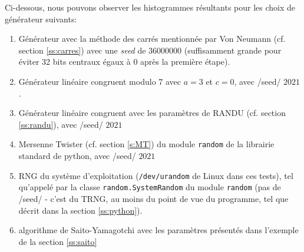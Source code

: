 \documentclass{scrartcl}
\begin{document}
Ci-dessous, nous pouvons observer les histogrammes résultants pour les choix de
générateur suivants:
\begin{enumerate}
\item Générateur avec la méthode des carrés mentionnée par Von Neumann
  (cf. section \ref{ss:carres}) avec une \textit{seed} de $36000000$
  (suffisamment grande pour éviter 32 bits centraux égaux à 0 après la première
  étape).
\item Générateur linéaire congruent modulo 7 avec $a=3$ et $c=0$, avec /seed/ $2021$.
\item Générateur linéaire congruent avec les paramètres de RANDU (cf. section
  \ref{ss:randu}), avec /seed/ $2021$
\item Mersenne Twister (cf. section \ref{s:MT}) du module \texttt{random} de la librairie standard de
  python, avec /seed/ $2021$
\item RNG du système d'exploitation (\texttt{/dev/urandom} de Linux dans ces
  tests), tel qu'appelé par la classe \texttt{random.SystemRandom} du module
  \texttt{random} (pas de /seed/ - c'est du TRNG, au moins du point de vue du
  programme, tel que décrit dans la section \ref{ss:python}).
\item algorithme de Saito-Yamagotchi avec les paramètres présentés dans
  l'exemple de la section \ref{ss:saito}
\end{enumerate}
\end{document}
